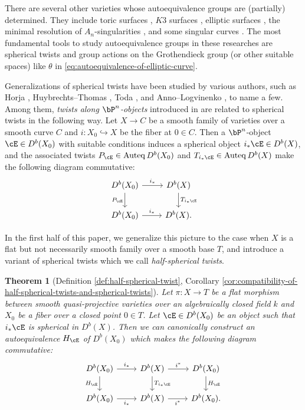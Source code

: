 \documentclass[12pt]{amsart}
\numberwithin{equation}{section}
\theoremstyle{plain}
\newtheorem{theorem}{Theorem}[section]
\theoremstyle{definition}
\DeclareMathOperator{\Auteq}{\mathrm{Auteq}}
\begin{document}
There are several other varieties whose autoequivalence groups are (partially) determined.
They include toric surfaces \cite{MR3162236}, $K3$ surfaces \cite{MR2553878, MR3592689}, elliptic surfaces \cite{MR3568337}, the minimal resolution of $A_n$-singularities \cite{MR2198807, MR2629510},
and some singular curves \cite{MR2264663, 2020arXiv201108288O}.
The most fundamental tools to study autoequivalence groups in these researches are spherical twists and group actions on the Grothendieck group (or other suitable spaces) like $\theta$ in \eqref{eq:autoequivalence-of-elliptic-curve}.

Generalizations of spherical twists have been studied by various authors,
such as
Horja \cite{MR2126495},
Huybrechts--Thomas \cite{MR2200048},
Toda \cite{MR2430202},
and
Anno--Logvinenko \cite{MR3692883},
to name a few.
Among them, \emph{twists along $\bP^n$-objects} introduced in \cite{MR2200048} are related to spherical twists in the following way.
Let $X \to C$ be a smooth family of varieties over a smooth curve $C$ and $i \colon X_{0} \hookrightarrow X$ be the fiber at $0 \in C$.
Then a $\bP^n$-object $\cE \in D^b(X_0)$ with suitable conditions induces a spherical object $i_*\cE \in D^b(X)$,
and the associated twists $P_{\cE} \in \Auteq{D^b(X_0)}$ and $T_{i_* \cE} \in \Auteq{D^b(X)}$ make the following diagram commutative:
\begin{equation} \label{eq:cd}
    \begin{tikzcd}
        D^b(X_0) \arrow[r,"i_*"]\arrow[d, "P_{\cE}"'] & D^b(X) \arrow[d,"T_{i_*{\cE}}"]\\
        D^b(X_0) \arrow[r, "i_*"]& D^b(X).
    \end{tikzcd}
\end{equation}

In the first half of this paper, we generalize this picture to the case when $X$ is a flat but not necessarily smooth family over a smooth base $T$, and introduce a variant of spherical twists which we call \emph{half-spherical twists}.
\begin{theorem}[Definition \ref{def:half-spherical-twist}, Corollary \ref{cor:compatibility-of-half-spherical-twists-and-spherical-twists}]\label{thm:main-theorem-1-half-spherical-twist}
    Let $\pi \colon X \to T$ be a flat morphism between smooth quasi-projective varieties over an algebraically closed field $k$ and $X_0$ be a fiber over a closed point $0 \in T$.
    Let $\cE \in D^b(X_0)$ be an object such that $i_*{\cE}$ is spherical in $D^b(X)$.
    Then we can canonically construct an autoequivalence $H_{\cE}$ of $D^b(X_0)$ which makes the following diagram commutative:
    \begin{equation}\label{eq:half-spherical-twist-commutative-diagram}
        \begin{tikzcd}
            D^b(X_0) \ar[r, "i_*"] \ar[d, "H_{\cE}"'] & D^b(X) \ar[r, "i^*"]\ar[d, "T_{i_*{\cE}}"] & D^b(X_0) \ar[d,  "H_{\cE}"]\\
            D^b(X_0) \ar[r, "i_*"'] & D^b(X) \ar[r, "i^*"'] & D^b(X_0).
        \end{tikzcd}
    \end{equation}
\end{theorem}
\end{document}
